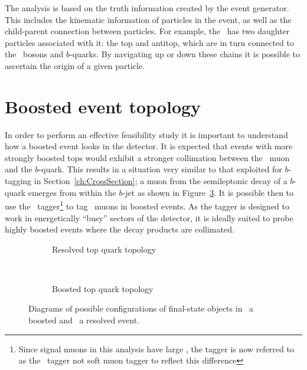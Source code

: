 The analysis is based on the truth information created by the event generator. This includes the kinematic information of particles in the event, as well as the child-parent connection between particles. For example, the \Zprime\ has two daughter particles associated with it: the top and antitop, which are in turn connected to the \W\ bosons and $b$-quarks. By navigating up or down these chains it is possible to ascertain the origin of a given particle.

\section{Boosted event topology}

In order to perform an effective feasibility study it is important to understand how a boosted event looks in the detector. It is expected that events with more strongly boosted tops would exhibit a stronger collimation between the \W\ muon and the $b$-quark. This results in a situation very similar to that exploited for $b$-tagging in Section~\ref{ch:CrossSection}; a muon from the semileptonic decay of a $b$-quark emerges from within the $b$-jet as shown in Figure~\ref{fig:SimpleAngularDiagrams}. It is possible then to use the \xsm\ tagger\footnote{Since signal muons in this analysis have large \pt, the tagger is now referred to as the \xsm\ tagger not soft muon tagger to reflect this difference} to tag \W\ muons in boosted events. As the tagger is designed to work in energetically ``busy'' sectors of the detector, it is ideally suited to probe highly boosted events where the decay products are collimated.

\begin{figure}[htbp]
  \centering
  \begin{subfigure}[b]{0.46\textwidth}
    \centering
      \def\svgwidth{184pt}
      
      \caption{Resolved top quark topology}\label{fig:NonBoostedDiagram}
  \end{subfigure}
~%
  \begin{subfigure}[b]{0.46\textwidth}
    \centering
      \def\svgwidth{147pt}
      
      \caption{Boosted top quark topology}\label{fig:BoostedDiagram}
  \end{subfigure}
  \caption[Diagrams of possible configurations of final-state objects in a boosted and a resolved event.]{Diagrams of possible configurations of final-state objects in~ a boosted and~ a resolved event.}\label{fig:SimpleAngularDiagrams}
\end{figure}

